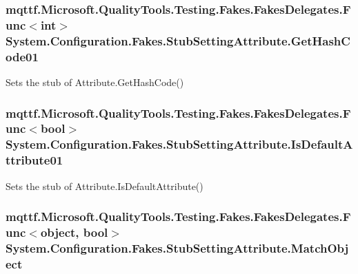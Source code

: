 \hypertarget{class_system_1_1_configuration_1_1_fakes_1_1_stub_setting_attribute_aabbf76fce6fe6046ace05c109e1b64da}{
\subsubsection[{Get\-Hash\-Code01}]{\setlength{\rightskip}{0pt plus 5cm}mqttf.\-Microsoft.\-Quality\-Tools.\-Testing.\-Fakes.\-Fakes\-Delegates.\-Func$<$int$>$ System.\-Configuration.\-Fakes.\-Stub\-Setting\-Attribute.\-Get\-Hash\-Code01}}\label{class_system_1_1_configuration_1_1_fakes_1_1_stub_setting_attribute_aabbf76fce6fe6046ace05c109e1b64da}


Sets the stub of Attribute.\-Get\-Hash\-Code()

\hypertarget{class_system_1_1_configuration_1_1_fakes_1_1_stub_setting_attribute_a3c76f9b00bb2d3e2bdde1306e690d6f7}{
\subsubsection[{Is\-Default\-Attribute01}]{\setlength{\rightskip}{0pt plus 5cm}mqttf.\-Microsoft.\-Quality\-Tools.\-Testing.\-Fakes.\-Fakes\-Delegates.\-Func$<$bool$>$ System.\-Configuration.\-Fakes.\-Stub\-Setting\-Attribute.\-Is\-Default\-Attribute01}}\label{class_system_1_1_configuration_1_1_fakes_1_1_stub_setting_attribute_a3c76f9b00bb2d3e2bdde1306e690d6f7}


Sets the stub of Attribute.\-Is\-Default\-Attribute()

\hypertarget{class_system_1_1_configuration_1_1_fakes_1_1_stub_setting_attribute_adf8e6ec1e0e4de477e58c3d043821bd2}{
\subsubsection[{Match\-Object}]{\setlength{\rightskip}{0pt plus 5cm}mqttf.\-Microsoft.\-Quality\-Tools.\-Testing.\-Fakes.\-Fakes\-Delegates.\-Func$<$object, bool$>$ System.\-Configuration.\-Fakes.\-Stub\-Setting\-Attribute.\-Match\-Object}}\label{class_system_1_1_configuration_1_1_fakes_1_1_stub_setting_attribute_adf8e6ec1e0e4de477e58c3d043821bd2}


